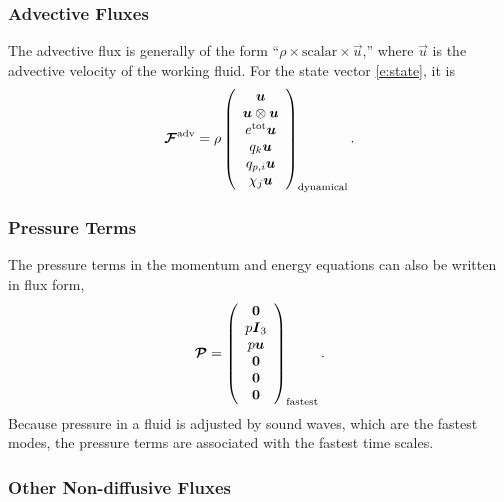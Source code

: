 \documentclass{article}
\begin{document}
\subsubsection{Advective Fluxes}

The advective flux is generally of the form ``$\rho \times \mathrm{scalar} \times \vec{u}$,'' where $\vec{u}$ is the advective velocity of the working fluid. For the state vector \eqref{e:state}, it is 
 \begin{equation}
 \label{e:adv_flux}
 \boldsymbol{{\mathcal{F}}}^{\mathrm{adv}}=\rho \left( \begin{array}{c}
 \boldsymbol{{u}} \\
 \boldsymbol{{u}} \otimes \boldsymbol{{u}} \\
 e^{\mathrm{tot}} \boldsymbol{{u}}\\
q_k \boldsymbol{{u}}\\
q_{p,i} \boldsymbol{{u}} \\
\chi_j \boldsymbol{{u}}
\end{array}
\right)_{\mathrm{dynamical}}.
 \end{equation}

\subsubsection{Pressure Terms}

The pressure terms in the momentum and energy equations can also be written in flux form,
\begin{equation}
\boldsymbol{{\mathcal{P}}} = \left( \begin{array}{c}
\boldsymbol{{0}} \\
p \boldsymbol{{I}}_3 \\
p \boldsymbol{{u}} \\
\boldsymbol{{0}} \\
\boldsymbol{{0}} \\
\boldsymbol{{0}} 
\end{array}
\right)_{\mathrm{fastest}}.
\end{equation}
Because pressure in a fluid is adjusted by sound waves, which are the fastest modes, the pressure terms are associated with the fastest time scales. 

\subsubsection{Other Non-diffusive Fluxes}
\end{document}
